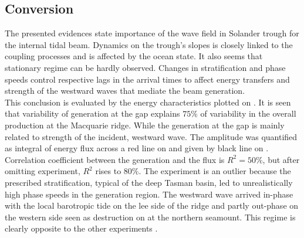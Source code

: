 \documentclass[12pt]{article}
\begin{document}
\subsection{Conversion}
\label{C3.sec:disc_conv}
The presented evidences state importance of the wave field in Solander trough for the internal 
tidal beam. Dynamics on the trough's slopes is closely linked to the coupling processes and is 
affected by the ocean state. It also seems that stationary regime can be hardly observed. Changes 
in stratification and phase speeds control respective lags in the arrival times to affect energy 
transfers and strength of the westward waves that mediate the beam generation.\\

This conclusion is evaluated by the energy characteristics plotted on 
. It is seen that variability of generation at the gap explains  
$75\%$ of variability in the overall production at the Macquarie ridge. While the generation at the 
gap is mainly related to strength of the incident, westward wave. The amplitude was 
quantified as integral of energy flux across a red line on  and 
given by black line on . Correlation coefficient between the 
generation and the flux is $R^2 = 50\%$, but after omitting  experiment, $R^2$ rises 
to $80\%$. The  experiment is an outlier because the prescribed stratification,  
typical of the deep Tasman basin, led to unrealistically high phase speeds in the 
generation region. The westward wave arrived in-phase with the local barotropic tide on the 
lee side of the ridge and partly out-phase on the western side seen as destruction on 
 at the northern seamount. This regime 
is clearly opposite to the other experiments .\\
\end{document}
